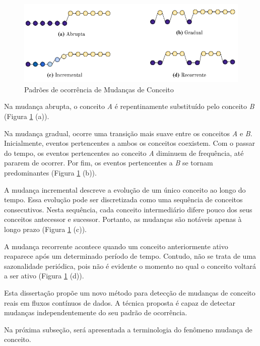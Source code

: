 \documentclass[msc, classic, a4paper]{ufbathesis}
\begin{document}
\begin{figure}[H]
\begin{center}
    \includegraphics[scale=0.8]{imagens/concept_drift_patterns.png}
    \caption{Padrões de ocorrência de Mudanças de Conceito}
    \label{fig:concept_drift_patterns}
\end{center}
\end{figure}

Na mudança abrupta, o conceito \textit{A} é repentinamente substituído pelo conceito \textit{B} (Figura \ref{fig:concept_drift_patterns} (a)).

Na mudança gradual, ocorre uma transição mais suave entre os conceitos \textit{A} e \textit{B}.
Inicialmente, eventos pertencentes a ambos os conceitos coexistem.
Com o passar do tempo, os eventos pertencentes ao conceito \textit{A} diminuem de frequência, até pararem de ocorrer.
Por fim, os eventos pertencentes a \textit{B} se tornam predominantes (Figura \ref{fig:concept_drift_patterns} (b)).

A mudança incremental descreve a evolução de um único conceito ao longo do tempo.
Essa evolução pode ser discretizada como uma sequência de conceitos consecutivos.
Nesta sequência, cada conceito intermediário difere pouco dos seus conceitos antecessor e sucessor.
Portanto, as mudanças são notáveis apenas à longo prazo (Figura \ref{fig:concept_drift_patterns} (c)).

A mudança recorrente acontece quando um conceito anteriormente ativo reaparece após um determinado período de tempo.
Contudo, não se trata de uma sazonalidade periódica, pois não é evidente o momento no qual o conceito voltará a ser ativo (Figura \ref{fig:concept_drift_patterns} (d)).

Esta dissertação propõe um novo método para detecção de mudanças de conceito reais em fluxos contínuos de dados.
A técnica proposta é capaz de detectar mudanças independentemente do seu padrão de ocorrência.

Na próxima subseção, será apresentada a terminologia do fenômeno mudança de conceito.
\end{document}
